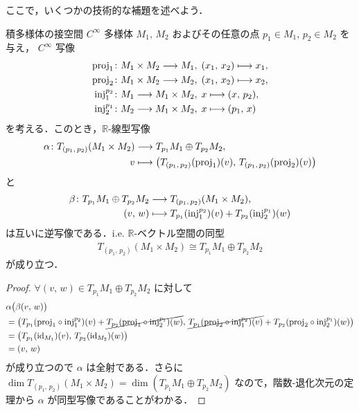 \documentclass[geometry_main]{subfiles}
\begin{document}
ここで，いくつかの技術的な補題を述べよう．

\begin{mylem}[label=lem:tangent-product,breakable]{積多様体の接空間}
    $C^\infty$ 多様体 $M_1,\, M_2$ およびその任意の点 $p_1 \in M_1,\, p_2 \in M_2$ を与え，
    $C^\infty$ 写像
    \begin{align}
        \mathrm{proj}_1 &\colon M_1 \times M_2 \longrightarrow M_1,\; (x_1,\, x_2) \longmapsto x_1, \\
        \mathrm{proj}_2 &\colon M_1 \times M_2 \longrightarrow M_2,\; (x_1,\, x_2) \longmapsto x_2, \\
        \mathrm{inj}_1^{p_2} &\colon M_1 \longrightarrow M_1 \times M_2,\; x \longmapsto (x,\, p_2), \\
        \mathrm{inj}_2^{p_1} &\colon M_2 \longrightarrow M_1 \times M_2,\; x \longmapsto (p_1,\, x)
    \end{align}
    を考える．このとき，$\mathbb{R}$-線型写像
    \begin{align}
        \alpha \colon T_{(p_1,\, p_2)}(M_1 \times M_2) &\longrightarrow T_{p_1} M_1 \oplus T_{p_2} M_2,\\ 
        v &\longmapsto \bigl( T_{(p_1,\, p_2)} (\mathrm{proj}_1)(v),\, T_{(p_1,\, p_2)} (\mathrm{proj}_2)(v) \bigr)
    \end{align}
    と
    \begin{align}
        \beta \colon T_{p_1} M_1 \oplus T_{p_2} M_2 &\longrightarrow T_{(p_1,\, p_2)}(M_1 \times M_2),\\ 
        (v,\, w) &\longmapsto T_{p_1} (\mathrm{inj}_1^{p_2})(v) + T_{p_2} (\mathrm{inj}_2^{p_1})(w)
    \end{align}
    は互いに逆写像である．i.e. $\mathbb{R}$-ベクトル空間の同型
    \begin{align}
        T_{(p_1,\, p_2)}(M_1 \times M_2) \cong T_{p_1} M_1 \oplus T_{p_2} M_2
    \end{align}
    が成り立つ．
\end{mylem}

\begin{proof}
    $\forall (v,\, w) \in T_{p_1}M_1 \oplus T_{p_2}M_2$ に対して
    \begin{align}
        &\alpha \bigl( \beta(v,\, w)\bigr)\\
        &= \bigl( T_{p_1}(\mathrm{proj}_1 \circ \mathrm{inj}_1^{p_2})(v) + \cancel{T_{p_2}(\mathrm{proj}_1 \circ \mathrm{inj}_2^{p_1})(w)},\, \cancel{T_{p_1}(\mathrm{proj}_2 \circ \mathrm{inj}_1^{p_2})(v)} + T_{p_2}(\mathrm{proj}_2 \circ \mathrm{inj}_2^{p_1})(w) \bigr)  \\
        &= \bigl( T_{p_1}(\mathrm{id}_{M_1})(v),\, T_{p_2}(\mathrm{id}_{M_2}) (w) \bigr) \\
        &= (v,\, w)
    \end{align}
    が成り立つので $\alpha$ は全射である．さらに $\dim T_{(p_1,\, p_2)}(M_1 \times M_2) = \dim  (T_{p_1} M_1 \oplus T_{p_2} M_2)$ なので，階数-退化次元の定理から $\alpha$ が同型写像であることがわかる．
\end{proof}
\end{document}

